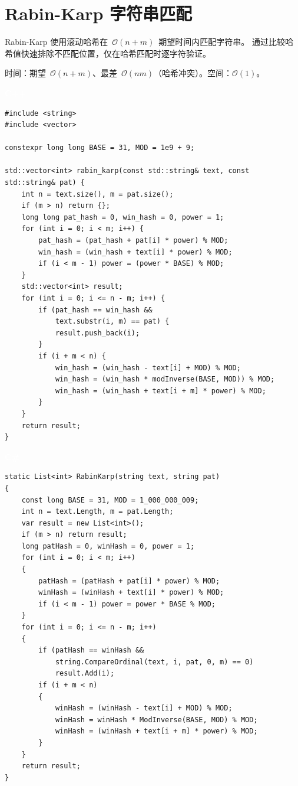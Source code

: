 \documentclass[12pt,a4paper,fontset=fandol]{ctexbook}
\newcommand{\cpplabel}{%
  \noindent\begin{tcolorbox}[sharp corners,colback=cppheadbg,colframe=cppheadbg,
    left=6pt,right=6pt,top=2pt,bottom=2pt,boxrule=0pt]
  \textcolor{white}{\small\bfseries\sffamily C++}\end{tcolorbox}%
}
\newcommand{\csharplabel}{%
  \noindent\begin{tcolorbox}[sharp corners,colback=csharpheadbg,colframe=csharpheadbg,
    left=6pt,right=6pt,top=2pt,bottom=2pt,boxrule=0pt]
  \textcolor{white}{\small\bfseries\sffamily C\#}\end{tcolorbox}%
}
\newcommand{\bigO}[1]{\mathcal{O}(#1)}
\begin{document}
\chapter{Rabin-Karp 字符串匹配}

Rabin-Karp 使用滚动哈希在~$\bigO{n+m}$~期望时间内匹配字符串。
通过比较哈希值快速排除不匹配位置，仅在哈希匹配时逐字符验证。

\begin{complexitybox}
  时间：期望~$\bigO{n+m}$、最差~$\bigO{nm}$（哈希冲突）。空间：$\bigO{1}$。
\end{complexitybox}

\cpplabel
\begin{lstlisting}[style=cppstyle]
#include <string>
#include <vector>

constexpr long long BASE = 31, MOD = 1e9 + 9;

std::vector<int> rabin_karp(const std::string& text, const std::string& pat) {
    int n = text.size(), m = pat.size();
    if (m > n) return {};
    long long pat_hash = 0, win_hash = 0, power = 1;
    for (int i = 0; i < m; i++) {
        pat_hash = (pat_hash + pat[i] * power) % MOD;
        win_hash = (win_hash + text[i] * power) % MOD;
        if (i < m - 1) power = (power * BASE) % MOD;
    }
    std::vector<int> result;
    for (int i = 0; i <= n - m; i++) {
        if (pat_hash == win_hash &&
            text.substr(i, m) == pat) {
            result.push_back(i);
        }
        if (i + m < n) {
            win_hash = (win_hash - text[i] + MOD) % MOD;
            win_hash = (win_hash * modInverse(BASE, MOD)) % MOD;
            win_hash = (win_hash + text[i + m] * power) % MOD;
        }
    }
    return result;
}
\end{lstlisting}

\csharplabel
\begin{lstlisting}[style=csharpstyle]
static List<int> RabinKarp(string text, string pat)
{
    const long BASE = 31, MOD = 1_000_000_009;
    int n = text.Length, m = pat.Length;
    var result = new List<int>();
    if (m > n) return result;
    long patHash = 0, winHash = 0, power = 1;
    for (int i = 0; i < m; i++)
    {
        patHash = (patHash + pat[i] * power) % MOD;
        winHash = (winHash + text[i] * power) % MOD;
        if (i < m - 1) power = power * BASE % MOD;
    }
    for (int i = 0; i <= n - m; i++)
    {
        if (patHash == winHash &&
            string.CompareOrdinal(text, i, pat, 0, m) == 0)
            result.Add(i);
        if (i + m < n)
        {
            winHash = (winHash - text[i] + MOD) % MOD;
            winHash = winHash * ModInverse(BASE, MOD) % MOD;
            winHash = (winHash + text[i + m] * power) % MOD;
        }
    }
    return result;
}
\end{lstlisting}
\end{document}
